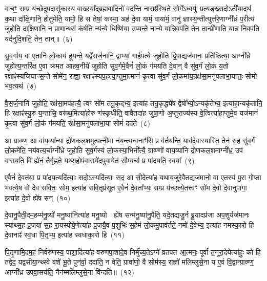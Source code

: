 वाच॒ꣳ॒ सम्प्र य॑च्छेदुप॒दासु॑कास्य॒ वाख्स्या᳚द्ब्रह्मवा॒दिनो॑ वदन्ति॒ नासꣴ॑स्थिते॒ सोमे᳚\-ऽध्व॒र्युः प्र॒त्यङ्ख्सदो\-ऽती॑या॒दथ॑ क॒था दा᳚क्षि॒णानि॒ होतु॑मेति॒ यामो॒ हि स तेषां॒ कस्मा॒ अह॑ दे॒वा यामं॒ वाया॑मं॒ वानु॑ ज्ञास्य॒न्तीत्युत्त॑रे॒णाग्नी᳚ध्रं प॒रीत्य॑ जुहोति दाक्षि॒णानि॒ न प्रा॒णान्थ्सं क॑र्\mbox{}षति॒ न्य॑न्ये धिष्णि॑या उ॒प्यन्ते॒ नान्ये यान्नि॒वप॑ति॒ तेन॒ तान्प्री॑णाति॒ यान्न नि॒वप॑ति॒ यद॑नुदि॒शति॒ तेन॒ तान्॥~(६)

{\anuvakamend[{स्तु॒ते वि॒न्दते॒ हि वी॑यन्ते प्र॒तीची॑रुद्गा॒त्र उ॒प्यन्ते॒ चतु॑र्दश च}]}%

सु॒व॒र्गाय॒ वा ए॒तानि॑ लो॒काय॑ हूयन्ते॒ यद्वै॑सर्ज॒नानि॒ द्वाभ्यां॒ गार्\mbox{}ह॑पत्ये जुहोति द्वि॒पाद्यज॑मानः॒ प्रति॑ष्ठित्या॒ आग्नी᳚ध्रे जुहोत्य॒न्तरि॑क्ष ए॒वा क्र॑मत आहव॒नीये॑ जुहोति सुव॒र्गमे॒वैनं॑ लो॒कं ग॑मयति दे॒वान् वै सु॑व॒र्गं लो॒कं य॒तो रक्षाꣴ॑स्यजिघाꣳस॒न्ते सोमे॑न॒ राज्ञा॒ रक्षाꣴ॑स्यप॒हत्या॒प्तुमा॒त्मानं॑ कृ॒त्वा सु॑व॒र्गं लो॒कमा॑य॒न्रक्ष॑सा॒मनु॑पलाभा॒यात्तः॒ सोमो॑ भव॒त्यथ॑~(७)

वै॒स॒र्ज॒नानि॑ जुहोति॒ रक्ष॑सा॒मप॑हत्यै॒ त्वꣳ सो॑म तनू॒कृद्भ्य॒ इत्या॑ह तनू॒कृद्ध्ये॑ष द्वेषो᳚भ्यो॒\-ऽन्यकृ॑तेभ्य॒ इत्या॑हा॒न्यकृ॑तानि॒ हि रक्षाꣴ॑स्यु॒रु य॒न्तासि॒ वरू॑थ॒मित्या॑हो॒रु ण॑स्कृ॒धीति॒ वावैतदा॑ह जुषा॒णो अ॒प्तुराज्य॑स्य वे॒त्वित्या॑हा॒प्तुमे॒व यज॑मानं कृ॒त्वा सु॑व॒र्गं लो॒कं ग॑मयति॒ रक्ष॑सा॒मनु॑पलाभा॒या सोमं॑ ददते~(८)

आ ग्राव्ण्ण॒ आ वा॑य॒व्या᳚न्या द्रो॑णकल॒शमुत्पत्नी॒मा न॑य॒न्त्यन्वनाꣳ॑सि॒ प्र व॑र्तयन्ति॒ याव॑दे॒वास्यास्ति॒ तेन॑ स॒ह सु॑व॒र्गं लो॒कमे॑ति॒ नय॑वत्य॒र्चाग्नी᳚ध्रे जुहोति सुव॒र्गस्य॑ लो॒कस्या॒भिनी᳚त्यै॒ ग्राव्ण्णो॑ वाय॒व्या॑नि द्रोणकल॒शमाग्नी᳚ध्र॒ उप॑ वासयति॒ वि ह्ये॑नं॒ तैर्गृ॒ह्णते॒ यथ्स॒होप॑वा॒सये॑दपुवा॒येत॑ सौ॒म्यर्चा प्र पा॑दयति॒ स्वया᳚~(९)

ए॒वैनं॑ दे॒वत॑या॒ प्र पा॑दय॒त्यदि॑त्याः॒ सदो॒\-ऽस्यदि॑त्याः॒ सद॒ आ सी॒देत्या॑ह यथाय॒जुरे॒वैतद्यज॑मानो॒ वा ए॒तस्य॑ पु॒रा गो॒प्ता भ॑वत्ये॒ष वो॑ देव सवितः॒ सोम॒ इत्या॑ह सवि॒तृप्र॑सूत ए॒वैनं॑ दे॒वता᳚भ्यः॒ सम्प्र य॑च्छत्ये॒तत्त्वꣳ सो॑म दे॒वो दे॒वानुपा॑गा॒ इत्या॑ह दे॒वो ह्ये॑ष सन्~(१०)

दे॒वानु॒पैती॒दम॒हम्म॑नु॒ष्यो॑ मनु॒ष्या॑नित्या॑ह मनु॒ष्यो  ह्ये॑ष सन्म॑नु॒ष्या॑नु॒पैति॒ यदे॒तद्यजु॒र्न ब्रू॒यादप्र॑जा अप॒शुर्यज॑मानः स्याथ्स॒ह प्र॒जया॑ स॒ह रा॒यस्पोषे॒णेत्या॑ह प्र॒जयै॒व प॒शुभिः॑ स॒हेमं लो॒कमु॒पाव॑र्तते॒ नमो॑ दे॒वेभ्य॒ इत्या॑ह नमस्का॒रो हि दे॒वानाꣴ॑ स्व॒धा पि॒तृभ्य॒ इत्या॑ह स्वधाका॒रो हि~(११)

पि॒तृ॒णामि॒दम॒हं निर्वरु॑णस्य॒ पाशा॒दित्या॑ह वरुणपा॒शादे॒व निर्मु॑च्य॒ते\-ऽग्ने᳚ व्रतपत आ॒त्मनः॒ पूर्वा॑ त॒नूरा॒देयेत्या॑हुः॒ को हि तद्वेद॒ यद्वसी॑या॒न्थ्स्वे वशे॑ भू॒ते पुन॑र्वा॒ ददा॑ति॒ न वेति॒ ग्रावा॑णो॒ वै सोम॑स्य॒ राज्ञो॑ मलिम्लुसे॒ना य ए॒वं वि॒द्वान्ग्राव्ण्ण॒ आग्नी᳚ध्र उपवा॒सय॑ति॒ नैन॑म्मलिम्लुसे॒ना वि॑न्दति॥~(१२)

